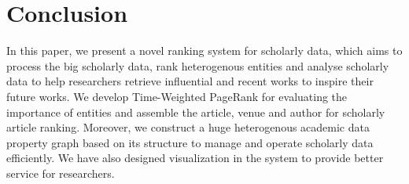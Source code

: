 \documentclass[10pt,conference,letterpaper]{IEEEtran}
\begin{document}
\IEEEpeerreviewmaketitle







\section{Conclusion}
In this paper, we present a novel ranking system for scholarly data, which aims to process the big scholarly data, rank heterogenous entities and analyse scholarly data to help researchers retrieve influential and recent works to inspire their future works. 
We develop Time-Weighted PageRank for evaluating the importance of entities and assemble the article, venue and author for scholarly article ranking. Moreover, we construct a huge heterogenous academic data property graph based on its structure to manage and operate scholarly data efficiently. We have also designed visualization in the system to provide better service for researchers. 




%
%
%






\end{document}
